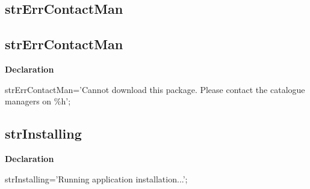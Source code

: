 \documentclass{report}
\newif\ifpdf
\begin{document}
\subsection*{\large{\textbf{strErrContactMan}}\normalsize\hspace{1ex}\hrulefill}
\else
\subsection*{strErrContactMan}
\fi
\label{trstrings-strErrContactMan}
\begin{list}{}{
\setlength{\itemindent}{0cm}
\setlength{\listparindent}{0cm}
\setlength{\leftmargin}{\evensidemargin}
\addtolength{\leftmargin}{\tmplength}
\settowidth{\labelsep}{X}
\addtolength{\leftmargin}{\labelsep}
\setlength{\labelwidth}{\tmplength}
}
\item[\textbf{Declaration}\hfill]
\ifpdf
\begin{flushleft}
\fi
\begin{ttfamily}
strErrContactMan='Cannot download this package. Please contact the catalogue managers on {\%}h';\end{ttfamily}

\ifpdf
\end{flushleft}
\fi

\end{list}
\ifpdf
\subsection*{\large{\textbf{strInstalling}}\normalsize\hspace{1ex}\hrulefill}
\else
\subsection*{strInstalling}
\fi
\label{trstrings-strInstalling}
\begin{list}{}{
\setlength{\itemindent}{0cm}
\setlength{\listparindent}{0cm}
\setlength{\leftmargin}{\evensidemargin}
\addtolength{\leftmargin}{\tmplength}
\settowidth{\labelsep}{X}
\addtolength{\leftmargin}{\labelsep}
\setlength{\labelwidth}{\tmplength}
}
\item[\textbf{Declaration}\hfill]
\ifpdf
\begin{flushleft}
\fi
\begin{ttfamily}
strInstalling='Running application installation...';\end{ttfamily}

\ifpdf
\end{flushleft}
\fi

\end{list}
\ifpdf
\end{document}
